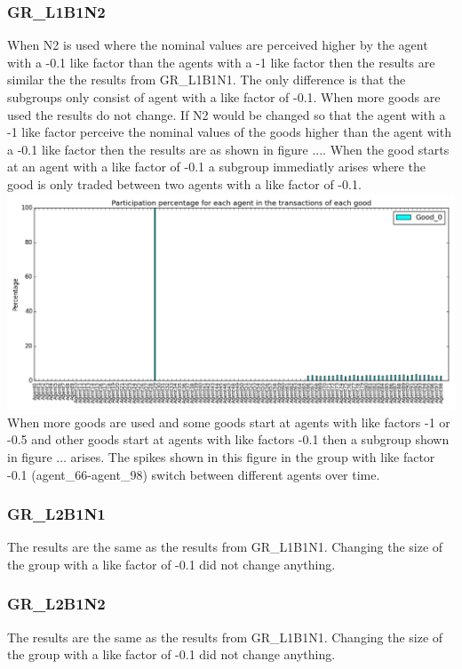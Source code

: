 \documentclass[twoside,openright]{uva-bachelor-thesis}
\begin{document}
\subsubsection{GR\_L1B1N2}
When N2 is used where the nominal values are perceived higher by the agent with a -0.1 like factor than the agents with a -1 like factor then the results are similar the the results from GR\_L1B1N1. The only difference is that the subgroups only consist of agent with a like factor of -0.1.
When more goods are used the results do not change.
If N2 would be changed so that the agent with a -1 like factor perceive the nominal values of the goods higher than the agent with a -0.1 like factor then the results are as shown in figure .... When the good starts at an agent with a like factor of -0.1 a subgroup immediatly arises where the good is only traded between two agents with a like factor of -0.1.
\includegraphics[scale=0.4]{Simulation_figures/GR_L1B1N2/321_1good}
When more goods are used and some goods start at agents with like factors -1 or -0.5 and other goods start at agents with like factors -0.1 then a subgroup shown in figure ... arises. The spikes shown in this figure in the group with like factor -0.1 (agent\_66-agent\_98) switch between different agents over time.

\subsubsection{GR\_L2B1N1}
The results are the same as the results from GR\_L1B1N1. Changing the size of the group with a like factor of -0.1 did not change anything. 
\subsubsection{GR\_L2B1N2}
The results are the same as the results from GR\_L1B1N1. Changing the size of the group with a like factor of -0.1 did not change anything. 
\end{document}
